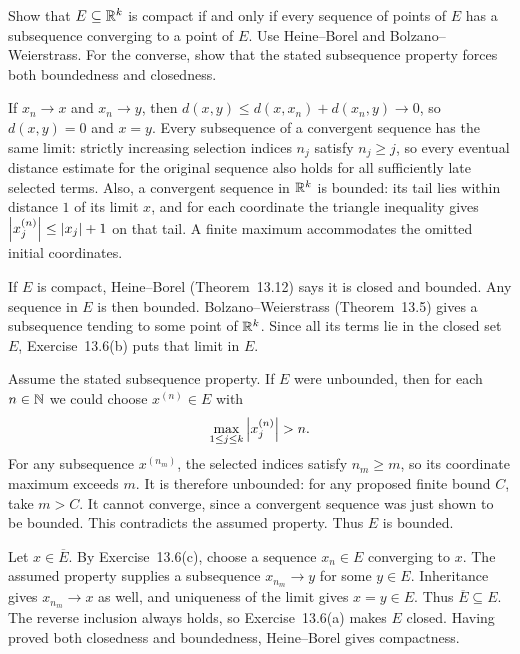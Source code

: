 \goal Show that $E\subseteq\mathbb{R}^k$ is compact if and only if
every sequence of points of $E$ has a subsequence converging to
a point of $E$.
\idea Use Heine--Borel and Bolzano--Weierstrass. For the converse,
show that the stated subsequence property forces both boundedness
and closedness.

If $x_n\to x$ and $x_n\to y$, then
$d(x,y)\le d(x,x_n)+d(x_n,y)\to0$, so $d(x,y)=0$ and $x=y$.
Every subsequence of a convergent sequence has the same limit:
strictly increasing selection indices $n_j$ satisfy $n_j\ge j$,
so every eventual distance estimate for the original sequence
also holds for all sufficiently late selected terms.
Also, a convergent sequence in $\mathbb{R}^k$ is bounded: its tail
lies within distance $1$ of its limit $x$, and for each
coordinate the triangle inequality gives
$\left|x_j^{(n)}\right|\le\left|x_j\right|+1$ on that tail. A finite
maximum accommodates the omitted initial coordinates.

If $E$ is compact, Heine--Borel (Theorem~13.12) says it is
closed and bounded. Any sequence in $E$ is then bounded.
Bolzano--Weierstrass (Theorem~13.5) gives a subsequence tending
to some point of $\mathbb{R}^k$. Since all its terms lie in the closed
set $E$, Exercise~13.6(b) puts that limit in $E$.

Assume the stated subsequence property. If $E$ were unbounded,
then for each $n\in\mathbb{N}$ we could choose $x^{(n)}\in E$ with
\[
 \max_{1\le j\le k}\abs{x_j^{(n)}}>n.
\]
For any subsequence $x^{(n_m)}$, the selected indices satisfy
$n_m\ge m$, so its coordinate maximum exceeds $m$.
It is therefore unbounded: for any proposed finite bound $C$,
take $m>C$. It cannot converge, since a convergent sequence
was just shown to be bounded. This contradicts the assumed
property. Thus $E$ is bounded.

Let $x\in\overline E$. By Exercise~13.6(c), choose a sequence
$x_n\in E$ converging to $x$. The assumed property supplies
a subsequence $x_{n_m}\to y$ for some $y\in E$.
Inheritance gives $x_{n_m}\to x$ as well, and uniqueness of
the limit gives $x=y\in E$. Thus $\overline E\subseteq E$.
The reverse inclusion always holds, so Exercise~13.6(a)
makes $E$ closed. Having proved both closedness and boundedness,
Heine--Borel gives compactness.

